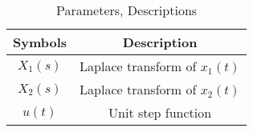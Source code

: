 \begin{table}[ht!]
\centering
\begin{tabular}{ |c|c| } 
 \hline
Symbols & Description \\
\hline
 $X_1(s)$ & Laplace transform of $x_1(t)$ \\
 \hline
 $X_2(s)$ & Laplace transform of $x_2(t)$\\
\hline
 $u(t)$ & Unit step function\\
\hline
\end{tabular}
\caption{Parameters, Descriptions}
\label{table:ee25-tab2}
\end{table}



